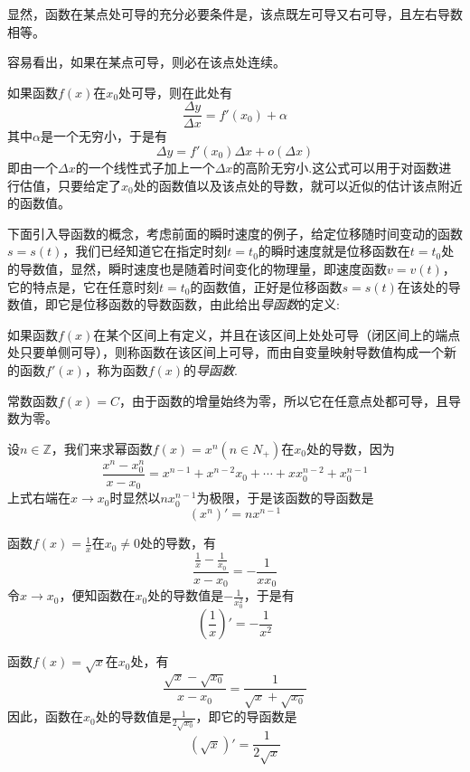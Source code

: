 显然，函数在某点处可导的充分必要条件是，该点既左可导又右可导，且左右导数相等。

容易看出，如果在某点可导，则必在该点处连续。

如果函数$f(x)$在$x_0$处可导，则在此处有
\[ \frac{\Delta y}{\Delta x} = f'(x_0)+\alpha \]
其中$\alpha$是一个无穷小，于是有
\[ \Delta y = f'(x_0)\Delta x + o(\Delta x) \]
即由一个$\Delta x$的一个线性式子加上一个$\Delta x$的高阶无穷小.这公式可以用于对函数进行估值，只要给定了$x_0$处的函数值以及该点处的导数，就可以近似的估计该点附近的函数值。

下面引入导函数的概念，考虑前面的瞬时速度的例子，给定位移随时间变动的函数$s=s(t)$，我们已经知道它在指定时刻$t=t_0$的瞬时速度就是位移函数在$t=t_0$处的导数值，显然，瞬时速度也是随着时间变化的物理量，即速度函数$v=v(t)$，它的特点是，它在任意时刻$t=t_0$的函数值，正好是位移函数$s=s(t)$在该处的导数值，即它是位移函数的导数函数，由此给出\emph{导函数}的定义:
\begin{definition}
  如果函数$f(x)$在某个区间上有定义，并且在该区间上处处可导（闭区间上的端点处只要单侧可导），则称函数在该区间上可导，而由自变量映射导数值构成一个新的函数$f'(x)$，称为函数$f(x)$的\emph{导函数}.
\end{definition}

\begin{example}
  常数函数$f(x)=C$，由于函数的增量始终为零，所以它在任意点处都可导，且导数为零。
\end{example}

\begin{example}
  设$n \in \mathbb{Z}$，我们来求幂函数$f(x)=x^n(n \in N_+)$在$x_0$处的导数，因为
  \[ \frac{x^n-x_0^n}{x-x_0} = x^{n-1}+x^{n-2}x_0+\cdots+xx_0^{n-2}+x_0^{n-1} \]
  上式右端在$x \to x_0$时显然以$nx_0^{n-1}$为极限，于是该函数的导函数是
  \[ (x^n)' = nx^{n-1} \]
\end{example}

\begin{example}
  函数$f(x)=\frac{1}{x}$在$x_0 \neq 0$处的导数，有
  \[ \frac{\frac{1}{x}-\frac{1}{x_0}}{x-x_0} = - \frac{1}{xx_0} \]
  令$x \to x_0$，便知函数在$x_0$处的导数值是$-\frac{1}{x_0^2}$，于是有
  \[ \left( \frac{1}{x} \right)' = - \frac{1}{x^2} \]
\end{example}

\begin{example}
  函数$f(x)=\sqrt{x}$在$x_0$处，有
  \[ \frac{\sqrt{x}-\sqrt{x_0}}{x-x_0} = \frac{1}{\sqrt{x}+\sqrt{x_0}} \]
  因此，函数在$x_0$处的导数值是$\frac{1}{2 \sqrt{x_0}}$，即它的导函数是
  \[ \left( \sqrt{x} \right) ' = \frac{1}{2 \sqrt{x}} \]
\end{example}

